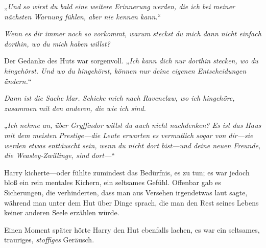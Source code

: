 „\emph{Und so wirst du bald eine weitere Erinnerung werden, die ich bei meiner nächsten Warnung fühlen, aber nie kennen kann.}“

\emph{Wenn es dir immer noch so vorkommt, warum steckst du mich dann nicht einfach dorthin, wo du mich haben willst?}

Der Gedanke des Huts war sorgenvoll. „\emph{Ich kann dich nur dorthin stecken, wo du hingehörst. Und wo du hingehörst, können nur deine eigenen Entscheidungen ändern.}“

\emph{Dann ist die Sache klar. Schicke mich nach Ravenclaw, wo ich hingehöre, zusammen mit den anderen, die wie ich sind. }

„\emph{Ich nehme an, über Gryffindor willst du auch nicht nachdenken? Es ist das Haus mit dem meisten Prestige—die Leute erwarten es vermutlich sogar von dir—sie werden etwas enttäuscht sein, wenn du nicht dort bist—und deine neuen Freunde, die Weasley-Zwillinge, sind dort—}“

Harry kicherte—oder fühlte zumindest das Bedürfnis, es zu tun; es war jedoch bloß ein rein mentales Kichern, ein seltsames Gefühl. Offenbar gab es Sicherungen, die verhinderten, dass man aus Versehen irgendetwas laut sagte, während man unter dem Hut über Dinge sprach, die man den Rest seines Lebens keiner anderen Seele erzählen würde.

Einen Moment später hörte Harry den Hut ebenfalls lachen, es war ein seltsames, trauriges, \emph{stoffiges} Geräusch.

